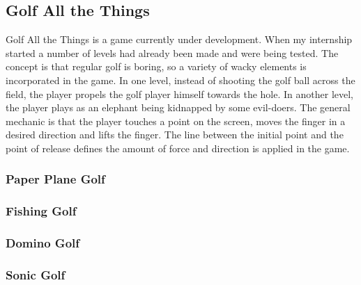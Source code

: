 \subsection{Golf All the Things}
Golf All the Things is a game currently under development. When my internship started a number of levels had already been made and were being tested. The concept is that regular golf is boring, so a variety of wacky elements is incorporated in the game. In one level, instead of shooting the golf ball across the field, the player propels the golf player himself towards the hole. In another level, the player plays as an elephant being kidnapped by some evil-doers. The general mechanic is that the player touches a point on the screen, moves the finger in a desired direction and lifts the finger. The line between the initial point and the point of release defines the amount of force and direction is applied in the game.

\subsubsection{Paper Plane Golf}

\subsubsection{Fishing Golf}

\subsubsection{Domino Golf}

\subsubsection{Sonic Golf}
